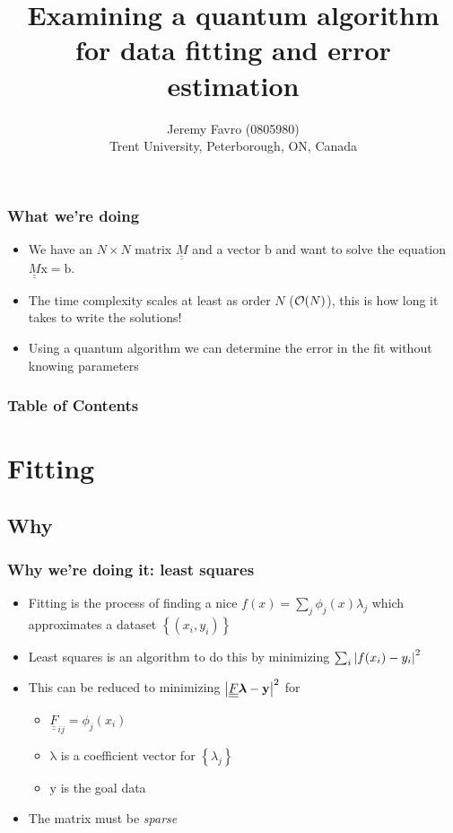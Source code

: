 \documentclass[10pt]{beamer}
\title{Examining a quantum algorithm for data fitting and error estimation}
\author{Jeremy Favro (0805980) \\ Trent University, Peterborough, ON, Canada}
\newcommand{\dul}[1]{\underline{\underline{#1}}}
\newcommand{\bv}[1]{\bm{\mathrm{#1}}}
\begin{document}
\begin{frame}
  \titlepage
\end{frame}

\begin{frame}
  \frametitle{What we're doing}
  \begin{itemize}
    \item We have an $N\times N$ matrix $\dul{M}$ and a vector $\bv{b}$ and want to solve the equation $\dul{M}\bv{x}=\bv{b}$.
    \item The time complexity scales at least as order $N$ ($\order{N}$), this is how long it takes to write the solutions!
    \item Using a quantum algorithm we can determine the error in the fit without knowing parameters
  \end{itemize}
\end{frame}

\begin{frame}
\frametitle{Table of Contents}
\tableofcontents
\end{frame}

\section{Fitting}
\subsection{Why}
\begin{frame}
  \frametitle{Why we're doing it: least squares}
  \begin{itemize}
    \item Fitting is the process of finding a nice $f(x)=\sum_j \phi_j(x)\lambda_j$ which approximates a dataset $\left\{(x_i,y_i)\right\}$
    \item Least squares is an algorithm to do this by minimizing $\sum_i\abs{f(x_i)-y_i}^2$
    \item This can be reduced to minimizing $\abs{\dul{F}\bv{\lambda}-\bv{y}}^2$ for
          \begin{itemize}
            \item $\dul{F}_{ij}=\phi_j(x_i)$
            \item $\bv{\lambda}$ is a coefficient vector for $\left\{\lambda_j\right\}$
            \item $\bv{y}$ is the goal data
          \end{itemize}
    \item The matrix must be \emph{sparse}
  \end{itemize}
\end{frame}
\end{document}
